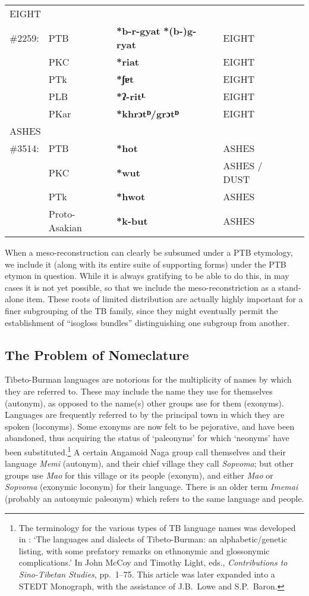 \begin{tabular}{l l l l p{2in}}
\multicolumn{4}{l}{EIGHT} \\
\#2259: & PTB & \textbf{*b-r-gyat} \STEDTU{⪤} \textbf{*(b-)g-ryat} & EIGHT \\
 & PKC & \textbf{*riat} & EIGHT \\
 & PTk & \textbf{*ʃɐt} & EIGHT \\
 & PLB & \textbf{*ʔ-ritᴸ} & EIGHT \\
 & PKar & \textbf{*khrɔtᴰ/grɔtᴰ} & EIGHT \\


\multicolumn{4}{l}{ASHES} \\
\#3514: & PTB & \textbf{*hot} & ASHES \\
 & PKC & \textbf{*wut} & ASHES / DUST \\
 & PTk & \textbf{*hwot} & ASHES \\
 & Proto-Asakian & \textbf{*k-but} & ASHES \\

\end{tabular}

When a meso-reconstruction can clearly be subsumed under a PTB etymology, we include it (along with its entire suite of supporting forms) under the PTB etymon in question. 
While it is always gratifying to be able to do this, in may cases it is not yet possible, so that we include the meso-reconstriction as a stand-alone item. These roots of limited distribution are actually highly important for a finer subgrouping of the TB family, since they might eventually permit the establishment of “isogloss bundles” distinguishing one subgroup from another.

\subsection{The Problem of Nomeclature}

Tibeto-Burman languages are notorious for the multiplicity of names by which
they are referred to. These may include the name they use for themselves
(autonym), as opposed to the name(s) other groups use for them (exonyms). 
Languages are frequently referred to by the principal town in which they are
spoken (loconyms). Some exonyms are now felt to be pejorative, and have been
abandoned, thus acquiring the status of ‘paleonyms’ for which ‘neonyms’ have
been substituted.\footnote{The terminology for the various types of TB language
names was developed in \citealt{JAM-LDTB}: ‘The languages and dialects of
Tibeto-Burman: an alphabetic/genetic listing, with some prefatory remarks on
ethnonymic and glossonymic complications.’  In John McCoy and Timothy Light,
eds., \textit{Contributions to Sino-Tibetan Studies},  pp.~1–75. This article was later
\citeyear{JAM-LDTB2} expanded into a STEDT Monograph, with the assistance of J.B.\ Lowe and
S.P.\ Baron.} A certain Angamoid Naga group call themselves and their language
\textit{Memi} (autonym), and their chief village they call \textit{Sopvoma};
but other groups use \textit{Mao} for this village or its people (exonym), and either \textit{Mao}
or \textit{Sopvoma} (exonymic loconym) for their language. There is an older term \textit{Imemai} (probably an
autonymic paleonym) which refers to the same language and people.


